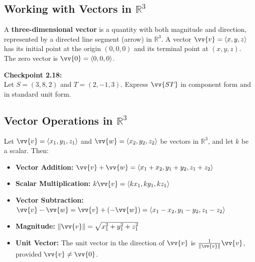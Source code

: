 \documentclass{article}
\begin{document}
\subsection*{Working with Vectors in \(\mathbb{R}^3\)}

\begin{definitionbox}
    A \textbf{three-dimensional vector} is a quantity with both magnitude and direction, represented by a directed line segment (arrow) in \(\mathbb{R}^3\). A vector \(\vv{v} = \langle x, y, z \rangle\) has its initial point at the origin \((0, 0, 0)\) and its terminal point at \((x, y, z)\). The zero vector is \(\vv{0} = \langle 0, 0, 0 \rangle\).
\end{definitionbox}

\begin{exercisebox}
    \textbf{Checkpoint 2.18:} \\
    Let \(S = (3, 8, 2)\) and \(T = (2, -1, 3)\). Express \(\vv{ST}\) in component form and in standard unit form.
\end{exercisebox}

\subsection*{Vector Operations in \(\mathbb{R}^3\)}

\begin{definitionbox}
    Let \(\vv{v} = \langle x_1, y_1, z_1 \rangle\) and \(\vv{w} = \langle x_2, y_2, z_2 \rangle\) be vectors in \(\mathbb{R}^3\), and let \(k\) be a scalar. Then:
    \begin{itemize}
        \item \textbf{Vector Addition:} \(\vv{v} + \vv{w} = \langle x_1 + x_2, y_1 + y_2, z_1 + z_2 \rangle\)
        \item \textbf{Scalar Multiplication:} \(k\vv{v} = \langle kx_1, ky_1, kz_1 \rangle\)
        \item \textbf{Vector Subtraction:} \(\vv{v} - \vv{w} = \vv{v} + (-\vv{w}) = \langle x_1 - x_2, y_1 - y_2, z_1 - z_2 \rangle\)
        \item \textbf{Magnitude:} \(\|\vv{v}\| = \sqrt{x_1^2 + y_1^2 + z_1^2}\)
        \item \textbf{Unit Vector:} The unit vector in the direction of \(\vv{v}\) is \(\frac{1}{\|\vv{v}\|} \vv{v}\), provided \(\vv{v} \neq \vv{0}\).
    \end{itemize}
\end{definitionbox}
\end{document}
